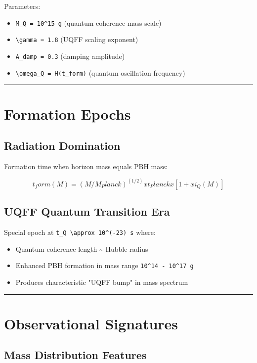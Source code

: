 \documentclass[12pt,a4paper]{article}
\begin{document}
Parameters:

\begin{itemize}
  \item \texttt{M\_Q = 10\^{}15 g} (quantum coherence mass scale)
  \item \texttt{\textbackslash gamma = 1.8} (UQFF scaling exponent)
  \item \texttt{A\_damp = 0.3} (damping amplitude)
  \item \texttt{\textbackslash omega\_Q = H(t\_form)} (quantum oscillation frequency)
\end{itemize}

\medskip\hrule\medskip

\section{Formation Epochs}

\subsection{Radiation Domination}

Formation time when horizon mass equals PBH mass:

\begin{equation}
t_form(M) = (M/M_Planck)^(1/2) x t_Planck x [1 + xi_Q(M)]
\end{equation}

\subsection{UQFF Quantum Transition Era}

Special epoch at \texttt{t\_Q \textbackslash approx 10\^{}(-23) s} where:

\begin{itemize}
  \item Quantum coherence length \textasciitilde{} Hubble radius
  \item Enhanced PBH formation in mass range \texttt{10\^{}14 - 10\^{}17 g}
  \item Produces characteristic "UQFF bump" in mass spectrum
\end{itemize}

\medskip\hrule\medskip

\section{Observational Signatures}

\subsection{Mass Distribution Features}
\end{document}
